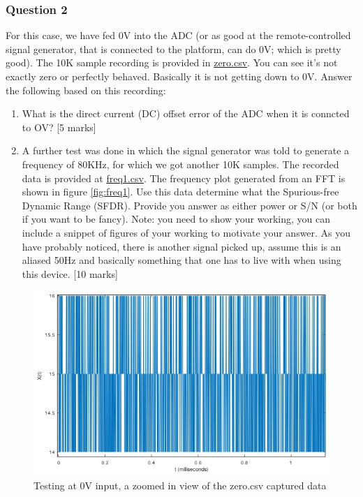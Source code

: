 \subsubsection{Question 2}

For this case, we have fed 0V into the ADC (or as good at the remote-controlled signal generator, that is connected to the platform, can do 0V; which is pretty good). The 10K sample recording is provided in \href{http://ocw.ee.uct.ac.za/courses/EEE3096S/miscres/adcmet1/zero.csv}{zero.csv}. You can see it’s not exactly zero or perfectly behaved. Basically it is not getting down to 0V. Answer the following based on this recording:

\begin{enumerate}
\item What is the direct current (DC) offset error of the ADC when it is conncted to OV? [5 marks]
\item A further test was done in which the signal generator was told to generate a frequency of 80KHz, for which we got another 10K samples. The recorded data is provided at \href{http://ocw.ee.uct.ac.za/courses/EEE3096S/miscres/adcmet1/freq1.csv}{freq1.csv}. The frequency plot generated from an FFT is shown in figure \ref{fig:freq1}. Use this data determine what the Spurious-free Dynamic Range (SFDR). Provide you answer as either power or S/N (or both if you want to be fancy). Note: you need to show your working, you can include a snippet of figures of your working to motivate your answer. As you have probably noticed, there is another signal picked up, assume this is an aliased 50Hz and basically something that one has to live with when using this device. [10 marks]
\end{enumerate}

\begin{figure}[H]
\centering
\includegraphics[width=0.8\columnwidth]{Body/ADC_Voltmeter/images/eee_adcmet_pr01_zero.jpg}
\caption{Testing at 0V input, a zoomed in view of the zero.csv captured data}
\label{fig:zerosamp}
\end{figure}


